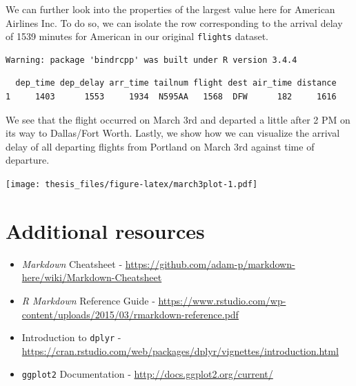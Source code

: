 \documentclass[12pt,twoside]{reedthesis}
\newenvironment{Shaded}{\begin{snugshade}}{\end{snugshade}}
\newcommand{\KeywordTok}[1]{\textcolor[rgb]{0.13,0.29,0.53}{\textbf{#1}}}
\newcommand{\DataTypeTok}[1]{\textcolor[rgb]{0.13,0.29,0.53}{#1}}
\newcommand{\DecValTok}[1]{\textcolor[rgb]{0.00,0.00,0.81}{#1}}
\newcommand{\StringTok}[1]{\textcolor[rgb]{0.31,0.60,0.02}{#1}}
\newcommand{\OperatorTok}[1]{\textcolor[rgb]{0.81,0.36,0.00}{\textbf{#1}}}
\newcommand{\NormalTok}[1]{#1}
\theoremstyle{definition}
\theoremstyle{definition}
\theoremstyle{definition}
\theoremstyle{remark}
\begin{document}
We can further look into the properties of the largest value here for
American Airlines Inc. To do so, we can isolate the row corresponding to
the arrival delay of 1539 minutes for American in our original
\texttt{flights} dataset.
\begin{Shaded}
\end{Shaded}
\begin{verbatim}
Warning: package 'bindrcpp' was built under R version 3.4.4
\end{verbatim}
\begin{verbatim}
  dep_time dep_delay arr_time tailnum flight dest air_time distance
1     1403      1553     1934  N595AA   1568  DFW      182     1616
\end{verbatim}
We see that the flight occurred on March 3rd and departed a little after
2 PM on its way to Dallas/Fort Worth. Lastly, we show how we can
visualize the arrival delay of all departing flights from Portland on
March 3rd against time of departure.
\begin{Shaded}
\end{Shaded}
\texttt{[image: thesis\_files/figure-latex/march3plot-1.pdf]}

\section{Additional resources}\label{additional-resources}
\begin{itemize}
\item
  \emph{Markdown} Cheatsheet -
  \url{https://github.com/adam-p/markdown-here/wiki/Markdown-Cheatsheet}
\item
  \emph{R Markdown} Reference Guide -
  \url{https://www.rstudio.com/wp-content/uploads/2015/03/rmarkdown-reference.pdf}
\item
  Introduction to \texttt{dplyr} -
  \url{https://cran.rstudio.com/web/packages/dplyr/vignettes/introduction.html}
\item
  \texttt{ggplot2} Documentation -
  \url{http://docs.ggplot2.org/current/}
\end{itemize}
\end{document}
